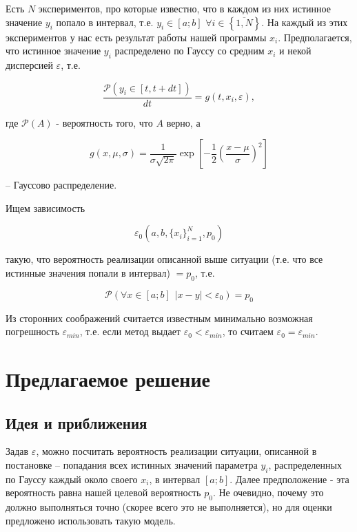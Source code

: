 \documentclass[a4paper,12pt]{article} %
\begin{document}
Есть $N$ экспериментов, про которые известно, что в каждом из них истинное значение $y_i$ попало в интервал, т.е. $y_i \in [a;b]$ $\forall i \in \left\{\overline{1,N}\right\}$. На каждый из этих экспериментов у нас есть результат работы нашей программы $x_i$. Предполагается, что истинное значение $y_{i}$ распределено по Гауссу со средним $x_i$ и некой дисперсией $\varepsilon$, т.е.

\begin{equation}
\dfrac{\mathcal{P}(y_i \in [t, t+dt])}{dt} = g(t, x_i, \varepsilon), 
\end{equation}

где $\mathcal{P}(A)$ - вероятность того, что $A$ верно, а

\begin{equation}
g(x, \mu, \sigma) = \dfrac{1}{\sigma \sqrt{2 \pi}} \exp{\left[ - \dfrac{1}{2} \left( \dfrac{x - \mu}{\sigma} \right)^2 \right]}
\end{equation}

-- Гауссово распределение.

Ищем зависимость

\begin{equation}
\varepsilon_0 \left( a, b, \{x_i\}_{i = 1}^{N}, p_0 \right)
\end{equation}

такую, что вероятность реализации описанной выше ситуации (т.е. что все истинные значения попали в интервал) $ = p_0$, т.е.

\begin{equation}
\mathcal{P}(\forall x \in [a;b] \hspace{5pt} |x - y| < \varepsilon_0) = p_0
\end{equation}

Из сторонних соображений считается известным минимально возможная погрешность $\varepsilon_{min}$, т.е. если метод выдает $\varepsilon_0 < \varepsilon_{min}$, то считаем $\varepsilon_0 = \varepsilon_{min}$.

\newpage

\section{Предлагаемое решение}

\subsection{Идея и приближения}

Задав $\varepsilon$, можно посчитать вероятность реализации ситуации, описанной в постановке -- попадания всех истинных значений параметра $y_i$, распределенных по Гауссу каждый около своего $x_i$, в интервал $[a;b]$. Далее предположение - эта вероятность равна нашей целевой вероятность $p_0$. Не очевидно, почему это должно выполняться точно (скорее всего это не выполняется), но для оценки предложено использовать такую модель. 
\end{document}
